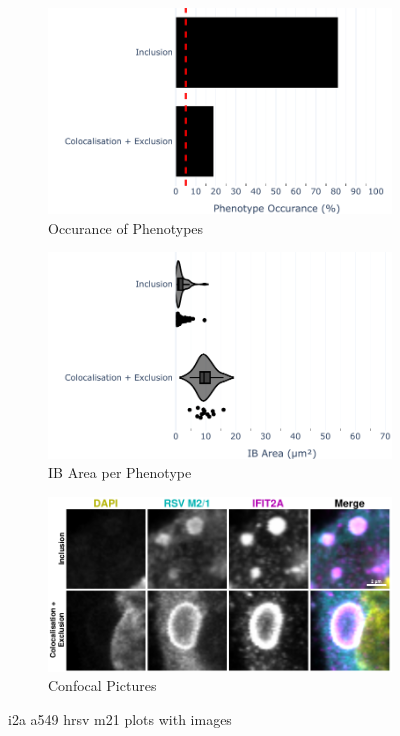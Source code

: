 \begin{figure}
    \begin{subfigure}{0.5\textwidth}
    \includegraphics[width=1\linewidth]{10. Chapter 5/Figs/01. Infection/01. IFIT2A/07. bar_i2a_a549-m21.pdf} 
    \caption[]{Occurance of Phenotypes}
    \end{subfigure}
    \begin{subfigure}{0.5\textwidth}
    \includegraphics[width=1\linewidth]{10. Chapter 5/Figs/01. Infection/01. IFIT2A/08. violin_i2a_a549-m21.pdf}
    \caption[]{IB Area per Phenotype}
    \end{subfigure}

    \begin{subfigure}{1\textwidth}
    \includegraphics[width=1\linewidth]{10. Chapter 5/Figs/01. Infection/01. IFIT2A/09. i2a a549 hrsv m21.pdf} 
    \caption[]{Confocal Pictures}
    \end{subfigure}
    \caption[i2a a549 hrsv m21 plots with images]{i2a a549 hrsv m21 plots with images}
    \label{fig:i2a a549 hrsv m21 plots with images}
\end{figure}

